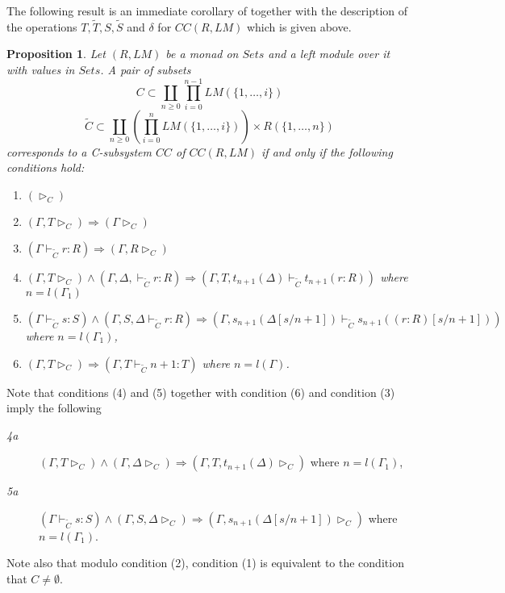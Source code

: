 \documentclass[11pt]{article}
\newtheorem{proposition}{Proposition}[subsection]
\newcommand{\llabel}[1]{\label{#1}}
\newcommand{\wt}{\widetilde}
\begin{document}
The following result is an immediate corollary of \cite[Proposition 4.3]{Csubsystems} together with the description of the operations $T,\wt{T},S,\wt{S}$ and $\delta$ for $CC(R,LM)$ which is given above. 
%
\begin{proposition}
\llabel{2009.10.16.prop3}
Let $(R,LM)$ be a monad on $Sets$ and a left module over it with values in $Sets$.  A pair of subsets 
%
$$C\subset \coprod_{n\ge 0} \prod_{i=0}^{n-1} LM(\{1,\dots,i\})$$
$$\wt{C}\subset \coprod_{n\ge 0}  (\prod_{i=0}^{n} LM(\{1,\dots,i\}))\times R(\{1,\dots,n\})$$
%
corresponds to a C-subsystem $CC$ of $CC(R,LM)$  if and only if the following conditions hold:
%
\begin{enumerate}
\item $(\rhd_{C})$
\item $(\Gamma, T\rhd_{C})\Rightarrow (\Gamma\rhd_{C})$
\item $(\Gamma\vdash_{\wt{C}} r:R)\Rightarrow (\Gamma,R\rhd_{C})$
\item $(\Gamma, T\rhd_{C})\wedge(\Gamma,\Delta,\vdash_{\wt{C}} r:R)\Rightarrow  (\Gamma, T, t_{n+1}(\Delta)\vdash_{\wt{C}} t_{n+1} (r: R))$
where $n=l(\Gamma_1)$
\item  $(\Gamma\vdash_{\wt{C}}  s:S)\wedge (\Gamma,S,\Delta\vdash_{\wt{C}} r:R)\Rightarrow (\Gamma, s_{n+1}(\Delta[s/n+1]) \vdash_{\wt{C}} s_{n+1} (( r : R ) [s/n+1]))$ where $n=l(\Gamma_1)$,
%
\item $(\Gamma,T\rhd_{C})\Rightarrow (\Gamma,T\vdash_{\wt{C}} n+1:T)$ where $n=l(\Gamma)$.
\end{enumerate}
%
\end{proposition}
%
Note that conditions (4) and (5) together with condition (6) and condition (3) imply the following 
%
\begin{description}
\item[{\em 4a}] $(\Gamma, T\rhd_{C})\wedge (\Gamma,\Delta\rhd_{C})\Rightarrow (\Gamma, T, t_{n+1}(\Delta)\rhd_{C})$ where $n=l(\Gamma_1)$,
%
\item[{\em 5a}] $(\Gamma\vdash_{\wt{C}}  s:S)\wedge (\Gamma,S,\Delta\rhd_{C})\Rightarrow (\Gamma, s_{n+1}(\Delta[s/n+1])\rhd_{C})$ where $n=l(\Gamma_1)$.
%
\end{description}
%
Note also that modulo condition (2), condition (1) is equivalent to the condition that $C\ne\emptyset$. 
\end{document}
